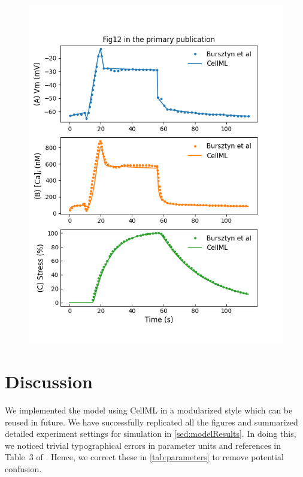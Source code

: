 \documentclass[fleqn,10pt]{physiome}
\begin{document}
\begin{figure}
\begin{minipage}[t]{\dimexpr.5\textwidth-0.2em}
  \includegraphics[width=\linewidth]{./figs/simFig12.png}
  \label{simFig12}
\end{minipage}
\end{figure}

\section{Discussion}
\label{sec:discussion}
We implemented the model \citep{bursztyn2007mathematical} using CellML in a modularized style which can be reused in future. We have successfully replicated all the figures and summarized detailed experiment settings for simulation in \autoref{sed:modelResults}. 
In doing this, we noticed trivial typographical errors in parameter units and references in Table~3 of \cite{bursztyn2007mathematical}. Hence, we correct these in \autoref{tab:parameters} to remove potential confusion.
\end{document}
